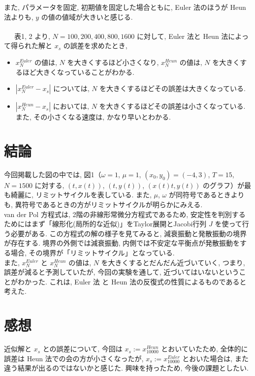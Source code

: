 \documentclass[11pt]{jsarticle}
\begin{document}
また, パラメータを固定, 初期値を固定した場合ともに, Euler 法のほうが Heun 法よりも, $y$ の値の値域が大きいと感じる. 
\ \\
\ \\
\ \ \ 表1, 2 より, $N = 100, 200, 400, 800, 1600$ に対して, Euler 法と Heun 法によって得られた解と $x_{s}$ の誤差を求めたとき, 
\begin{itemize}
\item $x^{Euler}_{N}$ の値は, $N$ を大きくするほど小さくなり, $x^{Heun}_{N}$ の値は, $N$ を大きくするほど大きくなっていることがわかる. 
\item $|x^{Euler}_{N} - x_{s}|$ については, $N$ を大きくするほどその誤差は大きくなっている. 
\item $|x^{Heun}_{N} - x_{s}|$ においては, $N$ を大きくするほどその誤差は小さくなっている. また, その小さくなる速度は, かなり早いとわかる. 
\end{itemize}



\section{結論}
今回掲載した図の中では, 図1（$\omega = 1$, $\mu = 1$, $(x_{0}, y_{0}) = (-4, 3)$, $T = 15$, $N = 1500$ に対する, $(t, x(t))$, $(t, y(t))$, $(x(t)t, y(t))$ のグラフ）が最も綺麗に, リミットサイクルを表している. また, $\mu$, $\omega$ が同符号であるときよりも, 異符号であるときの方がリミットサイクルが明らかにみえる. \\
van der Pol 方程式は, 2階の非線形常微分方程式であるため, 安定性を判別するためにはまず「線形化(局所的な近似)」をTaylor展開とJacobi行列 $J$ を使って行う必要がある. この方程式の解の様子を見てみると, 減衰振動と発散振動の境界が存在する. 境界の外側では減衰振動, 内側では不安定な平衡点が発散振動をする場合, その境界が「リミットサイクル」となっている. \\
また, $x^{Euler}_{N}$ と $x^{Heun}_{N}$ の値は, $N$ を大きくするとだんだん近づいていく, つまり, 誤差が減ると予測していたが, 今回の実験を通して, 近づいてはいないということがわかった. 
これは, Euler 法 と Heun 法の反復式の性質によるものであると考えた. 



\section{感想}
近似解と $x_{s}$ との誤差について, 今回は $x_{s} := x^{Heun}_{10000}$ とおいていたため, 全体的に誤差は Heun 法での会の方が小さくなったが, $x_{s} := x^{Euler}_{10000}$ とおいた場合は, また違う結果が出るのではないかと感じた. 興味を持ったため, 今後の課題としたい.  \\
\end{document}
